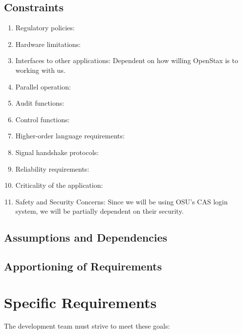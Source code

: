 \documentclass[onecolumn, draftclsnofoot,10pt, compsoc]{IEEEtran}
\begin{document}
\subsection{Constraints}

\begin{enumerate}
\item Regulatory policies:
\item Hardware limitations: 
\item Interfaces to other applications: Dependent on how willing OpenStax is to working with us.
\item Parallel operation:
\item Audit functions:
\item Control functions:
\item Higher-order language requirements:
\item Signal handshake protocols:
\item Reliability requirements:
\item Criticality of the application:
\item Safety and Security Concerns: Since we will be using OSU's CAS login system, we will be partially dependent on their security. 
\end{enumerate}

\subsection{Assumptions and Dependencies}

\subsection{Apportioning of Requirements}

\section{Specific Requirements}
The development team must strive to meet these goals:
\end{document}
